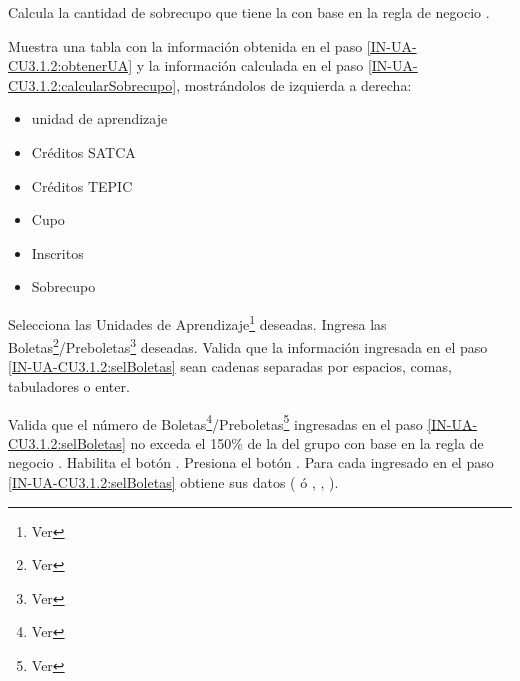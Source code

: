 \begin{UCtrayectoria}
	\UCpaso  \label{IN-UA-CU3.1.2:calcularSobrecupo}Calcula la cantidad de sobrecupo que tiene la  con base en la regla de negocio .
	
	\UCpaso Muestra una tabla con la información obtenida en el paso \ref{IN-UA-CU3.1.2:obtenerUA} y la información calculada en el paso \ref{IN-UA-CU3.1.2:calcularSobrecupo}, mostrándolos de izquierda a derecha:
	\begin{itemize}
		\item unidad de aprendizaje
		\item Créditos SATCA
		\item Créditos TEPIC
		\item Cupo
		\item Inscritos
		\item Sobrecupo
	\end{itemize}
	\UCpaso[\UCactor]  \label{IN-UA-CU3.1.2:selUA}Selecciona las Unidades de Aprendizaje\footnote{Ver } deseadas.
	\UCpaso[\UCactor]  \label{IN-UA-CU3.1.2:selBoletas}Ingresa las Boletas\footnote{Ver }/Preboletas\footnote{Ver } deseadas.
	\UCpaso Valida que la información ingresada en el paso \ref{IN-UA-CU3.1.2:selBoletas} sean cadenas separadas por espacios, comas, tabuladores o enter.
	
	\UCpaso Valida que el número de Boletas\footnote{Ver }/Preboletas\footnote{Ver } ingresadas en el paso \ref{IN-UA-CU3.1.2:selBoletas} no exceda el 150\% de la  del grupo con base en la regla de negocio .
	\UCpaso Habilita el botón .
	\UCpaso[\UCactor] \label{IN-UA-CU3.1.2:agregarAlGrupo}Presiona el botón .
	\UCpaso  \label{IN-UA-CU3.1.2:obtenerEstudiante}Para cada  ingresado en el paso \ref{IN-UA-CU3.1.2:selBoletas} obtiene sus datos ( ó , , ).
	

\end{UCtrayectoria}
